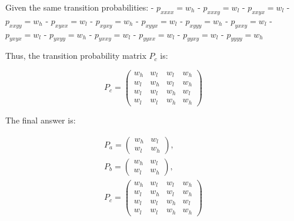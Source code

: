 Given the same transition probabilities:
- \(p_{xxxx} = w_h\)
- \(p_{xxxy} = w_l\)
- \(p_{xxyx} = w_l\)
- \(p_{xxyy} = w_h\)
- \(p_{xyxx} = w_l\)
- \(p_{xyxy} = w_h\)
- \(p_{xyyx} = w_l\)
- \(p_{xyyy} = w_h\)
- \(p_{yxxy} = w_l\)
- \(p_{yxyx} = w_l\)
- \(p_{yxyy} = w_h\)
- \(p_{yxxy} = w_l\)
- \(p_{yyxx} = w_l\)
- \(p_{yyxy} = w_l\)
- \(p_{yyyy} = w_h\)

Thus, the transition probability matrix \(P_c\) is:

\[ P_c = \begin{pmatrix}
w_h & w_l & w_l & w_h \\
w_l & w_h & w_l & w_h \\
w_l & w_l & w_h & w_l \\
w_l & w_l & w_h & w_h
\end{pmatrix} \]

The final answer is:

\[
\boxed{
\begin{array}{c}
P_a = \begin{pmatrix}
w_h & w_l \\
w_l & w_h
\end{pmatrix}, \\
P_b = \begin{pmatrix}
w_h & w_l \\
w_l & w_h
\end{pmatrix}, \\
P_c = \begin{pmatrix}
w_h & w_l & w_l & w_h \\
w_l & w_h & w_l & w_h \\
w_l & w_l & w_h & w_l \\
w_l & w_l & w_h & w_h
\end{pmatrix}
\end{array}
}
\]